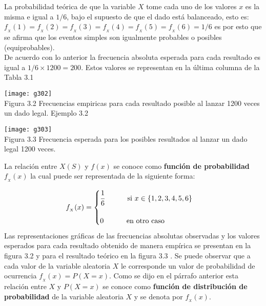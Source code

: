 \documentclass[base=hide,12pt]{elegantbook}
\begin{document}
La probabilidad teórica de que la variable $X$ tome cada uno de los valores $x$  es la misma e igual a $1/6$, bajo el supuesto de que el dado está balanceado, esto es: $f_{_{X}}(1) = f_{_{X}}(2) = f_{_{X}}(3) = f_{_{X}}(4) = f_{_{X}}(5) = f_{_{X}}(6) = 1/6 $ es por esto que se afirma que los eventos simples son igualmente probables o posibles (equiprobables). \\

De acuerdo con lo anterior la frecuencia absoluta esperada para cada resultado es igual a $1/6 \times 1200 = 200$. Estos valores se representan en la última columna de la Tabla 3.1  \\
\begin{center}
\texttt{[image: g302]}\\
Figura 3.2 Frecuencias empiricas para cada resultado posible al lanzar 1200 veces un dado legal. Ejemplo 3.2 
\end{center}

\begin{center}
\texttt{[image: g303]}\\
 Figura 3.3 Frecuencia esperada para los posibles resultados al lanzar un dado legal 1200 veces.
	\end{center}


La relación entre $X(S)$ y $f(x)$ se conoce como {\bf función de probabilidad} $f_{_{X}}(x)$  la cual puede ser representada de la siguiente forma:

\[f_{_X}(x)= \begin{cases}
	\cfrac{1}{6} \hspace{1cm} \textnormal{ si } x \in \lbrace1,2,3,4,5,6\rbrace\\
	\\
	0 \hspace{1cm}\textnormal{ en otro caso }
\end{cases}
\]
%
Las representaciones gráficas de las frecuencias absolutas  observadas y los valores esperados para cada resultado obtenido de manera empírica se presentan en la figura 3.2  y para el resultado teórico en la figura  3.3 . Se puede observar que a cada valor de la variable aleatoria $X$ le corresponde un valor de probabilidad de ocurrencia $f_{_{X}}(x) =P(X=x)$. Como se dijo en el párrafo anterior esta relación entre $X$ y $P(X=x)$ se conoce como {\bf función de distribución de probabilidad} de la variable aleatoria $X$ y se denota  por $f_{_{X}}(x)$. \\
\end{document}
